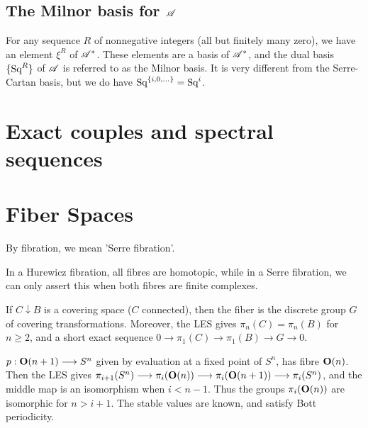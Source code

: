 \documentclass[11pt]{article}
\begin{document}
\subsection{The Milnor basis for \texorpdfstring{$\mathscr{A}$}{A}}
For any sequence $R$ of nonnegative integers (all but finitely many zero), we have an element $\xi^R$ of $\mathscr{A}^*$. These elements are a basis of $\mathscr{A}^*$, and the dual basis $\{\textup{Sq}^R\}$ of $\mathscr{A}$ is referred to as the Milnor basis. It is very different from the Serre-Cartan basis, but we do have $\textup{Sq}^{\{i,0,\ldots\}}=\textup{Sq}^i$.

\section{Exact couples and spectral sequences}

\section{Fiber Spaces}
\begin{itemise}
\item By fibration, we mean 'Serre fibration'.
\item In a Hurewicz fibration, all fibres are homotopic, while in a Serre fibration, we can only assert this when both fibres are finite complexes.
\item If $C\downarrow B$ is a covering space ($C$ connected), then the fiber is the discrete group $G$ of covering transformations. Moreover, the LES gives $\pi_n(C)=\pi_n(B)$ for $n\geq2$, and a short exact sequence $0\to\pi_1(C)\to\pi_1(B)\to G\to0$.
\item $p:\textup{\textbf{O}}(n+1)\longrightarrow S^n$ given by evaluation at a fixed point of $S^n$, has fibre $\textup{\textbf{O}}(n)$. Then the LES gives $\pi_{i+1}(S^n)\longrightarrow\pi_i(\textup{\textbf{O}}(n))\longrightarrow\pi_i(\textup{\textbf{O}}(n+1))\longrightarrow\pi_i(S^n)$, and the middle map is an isomorphism when $i<n-1$. Thus the groups $\pi_i(\textup{\textbf{O}}(n))$ are isomorphic for $n>i+1$. The stable values are known, and satisfy Bott periodicity.
\end{itemise}
\setcounter{subsection}{3}
\end{document}
